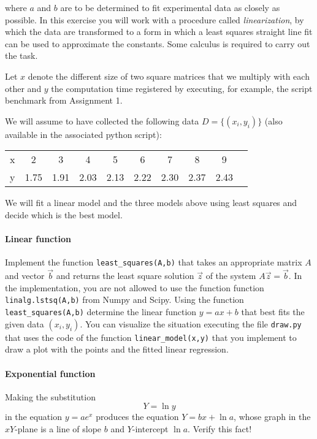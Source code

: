 \documentclass[a4paper,10pt]{article}
\begin{document}
where $a$ and $b$ are to be determined to fit experimental data as
closely as possible. In this exercise you will work with a procedure
called \emph{linearization}, by which the data are transformed to a form
in which a least squares straight line fit can be used to approximate
the constants. Some calculus is required to carry out the task.


Let $x$ denote the different size of two square matrices that we
multiply with each other and $y$ the computation time registered by
executing, for example, the script benchmark from Assignment 1.

We will assume to have collected the following data $D=\{(x_i,y_i)\}$
(also available in the associated python script):

\begin{table}[h]
  \centering
  \begin{tabular}{l|*{9}{c}}
    x&2&3&4&5&6&7&8&9\\
    y&1.75&1.91&2.03&2.13&2.22&2.30&2.37&2.43
  \end{tabular}
\end{table}
    
We will fit a linear model and the three models above using least
squares and decide which is the best model.



\paragraph{Linear function} Implement the function
\lstinline{least_squares(A,b)} that takes an appropriate matrix $A$ and
vector $\vec b$ and returns the least square solution $\vec z$ of the
system $A\vec z=\vec b$. In the implementation, you are not allowed to
use the function function \lstinline{linalg.lstsq(A,b)} from Numpy and
Scipy.  Using the function \lstinline{least_squares(A,b)} determine the
linear function $y=ax + b$ that best fits the given data $(x_i,y_i)$.
You can visualize the situation executing the file \lstinline{draw.py}
that uses the code of the function \lstinline{linear_model(x,y)} that
you implement to draw a plot with the points and the fitted linear
regression.

\paragraph{Exponential function}
Making the substitution \[Y=\ln y\] in the equation $y=ae^x$ produces the
equation $Y=bx+\ln a$, whose graph in the $xY$-plane is a line of slope
$b$ and $Y$-intercept $\ln a$.  Verify this fact!
\end{document}
